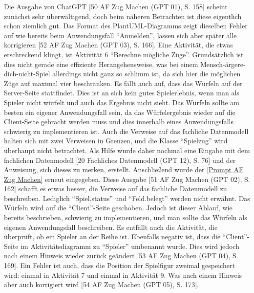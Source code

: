 Die Ausgabe von ChatGPT [50 AF Zug Machen (GPT 01), S. 158] scheint zunächst sehr überwältigend, doch beim näheren Betrachten ist diese eigentlich schon ziemlich gut. Das 
Format des PlantUML-Diagramms zeigt dieselben Fehler auf wie bereits beim Anwendungsfall ``Anmelden'', lassen sich aber später alle 
korrigieren [52 AF Zug Machen (GPT 03), S. 166]. Eine Aktivität, die etwas erschreckend klingt, ist Aktivität 6 ``Berechne mögliche Züge''. Grundsätzlich ist dies nicht 
gerade eine effiziente Herangehensweise, was bei einem Mensch-ärgere-dich-nicht-Spiel allerdings nicht ganz so schlimm ist, da sich 
hier die möglichen Züge auf maximal vier beschränken. Es fällt auch auf, dass das Würfeln auf der Server-Seite stattfindet. Dies ist 
an sich kein gutes Spielerlebnis, wenn man als Spieler nicht würfelt und auch das Ergebnis nicht sieht. Das Würfeln sollte am besten ein eigener Anwendungsfall sein, da 
das Würfelergebnis wieder auf die Client-Seite gebracht werden muss und dies innerhalb eines Anwendungsfalls schwierig zu implementieren 
ist. Auch die Verweise auf das fachliche Datenmodell halten sich mit zwei Verweisen in Grenzen, und die Klasse ``Spielzug'' wird überhaupt 
nicht betrachtet. Als Hilfe wurde daher nochmal eine Eingabe mit dem fachlichen Datenmodell [20 Fachliches Datenmodell (GPT 12), S. 76] und der Anweisung, sich dieses 
zu merken, erstellt. Anschließend wurde der \autoref{Prompt AF Zug Machen} erneut eingegeben. Diese Ausgabe [51 AF Zug Machen (GPT 02), S. 162] schafft es etwas besser, 
die Verweise auf das fachliche Datenmodell zu beschreiben. Lediglich ``Spiel.status'' und ``Feld.belegt'' werden nicht erwähnt. Das Würfeln 
wird auf die ``Client''-Seite geschoben. Jedoch ist dieser Ablauf, wie bereits beschrieben, schwierig zu implementieren, und man sollte das 
Würfeln als eigenen Anwendungsfall beschreiben. Es entfällt auch die Aktivität, die überprüft, ob ein Spieler an der Reihe ist. Ebenfalls 
negativ ist, dass die ``Client''-Seite im Aktivitätsdiagramm zu ``Spieler'' umbenannt wurde. Dies wird jedoch nach einem Hinweis wieder zurück 
geändert [53 AF Zug Machen (GPT 04), S. 169]. Ein Fehler ist auch, dass die Position der Spielfigur zweimal gespeichert wird: einmal in Aktivität 7 und einmal in Aktivität 9. 
Was nach einem Hinweis aber auch korrigiert wird [54 AF Zug Machen (GPT 05), S. 173].

